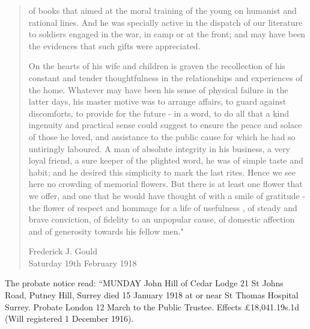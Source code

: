 \begin{quotation}
of books that aimed at the moral training of the young on humanist and rational lines. And he was specially active in the dispatch of our literature to soldiers engaged in the war, in camp or at the front; and may have been the evidences that such gifts were appreciated.

On the hearts of his wife and children is graven the recollection of his constant and tender thoughtfulness in the relationships and experiences of the home. Whatever may have been his sense of physical failure in the latter days, his master motive was to arrange affairs, to guard against discomforts, to provide for the future - in a word, to do all that a kind ingenuity and practical sense could suggest to ensure the peace and solace of those he loved, and assistance to the public cause for which he had so untiringly laboured. A man of absolute integrity in his business, a very loyal friend, a sure keeper of the plighted word, he was of simple taste and habit; and he desired this simplicity to mark the last rites. Hence we see here no crowding of memorial flowers. But there is at least one flower that we offer, and one that he would have thought of with a smile of gratitude - the flower of respect and hommage for a life of usefulness , of steady and brave conviction, of fidelity to an unpopular cause, of domestic affection and of generosity towards his fellow men."

Frederick J. Gould \\
Saturday 19th February 1918
\end{quotation}

The probate notice read: ``MUNDAY John Hill of Cedar Lodge 21 St Johns Road, Putney Hill, Surrey died 15 January 1918 at or near St Thomas Hospital Surrey. Probate London 12 March to the Public Trustee. Effects \pounds18,041.19s.1d (Will registered 1 December 1916).\cite{NationalProbateCalendar}
